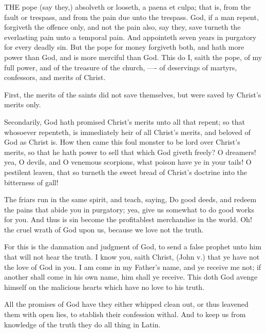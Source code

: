 THE pope (say they,) absolveth or looseth, a paena et 
culpa; that is, from the fault or trespass, and from the 
pain due unto the trespass. God, if a man repent, forgiveth
the offence only, and not the pain also, say they, 
save turneth the everlasting pain unto a temporal pain. 
And appointeth seven years in purgatory for every deadly 
sin. But the pope for money forgiveth both, and hath 
more power than God, and is more merciful than God. 
This do I, saith the pope, of my full power, and of the 
treasure of the church, —- of deservings of martyrs, confessors,
and merits of Christ. 

First, the merits of the saints did not save themselves, 
but were saved by Christ's merits only. 

Secondarily, God hath promised Christ's merits unto 
all that repent; so that whosoever repenteth, is immediately
heir of all Christ's merits, and beloved of God as 
Christ is. How then came this foul monster to be lord 
over Christ's merits, so that he hath power to sell that 
which God giveth freely? O dreamers! yea, O devils, 
and O venemous scorpions, what poison have ye in your 
tails! O pestilent leaven, that so turneth the sweet bread 
of Christ's doctrine into the bitterness of gall! 

The friars run in the same spirit, and teach, saying, 
Do good deeds, and redeem the pains that abide you in 
purgatory; yea, give us somewhat to do good works for 
you. And thus is sin become the profitablest merchandise
in the world. Oh! the cruel wrath of God upon us, 
because we love not the truth. 

For this is the damnation and judgment of God, to 
send a false prophet unto him that will not hear the truth. 
I know you, saith Christ, (John v.) that ye have not the 
love of God in you. I am come in my Father's name, 
and ye receive me not; if another shall come in his own 
name, him shall ye receive. This doth God avenge himself
on the malicious hearts which have no love to his 
truth. 

All the promises of God have they either whipped clean 
out, or thus leavened them with open lies, to stablish 
their confession withal. And to keep us from knowledge 
of the truth they do all thing in Latin. 

